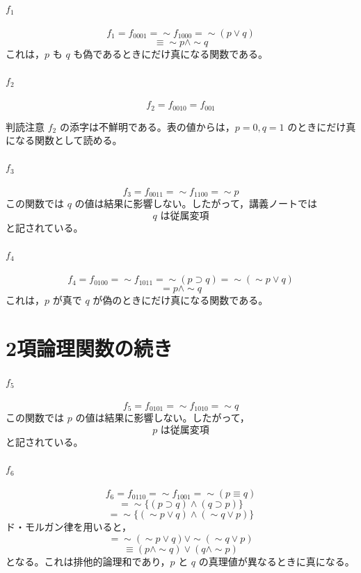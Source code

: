 \documentclass[../main.tex]{subfiles}
\begin{document}
\paragraph{\texorpdfstring{\(f_1\)}{f1}}
\[
  f_1
  =
  f_{0001}
  =
  \sim f_{1000}
  =
  \sim(p \lor q)
\]
\[
  \equiv
  \sim p \land \sim q
\]
これは，\(p\) も \(q\) も偽であるときにだけ真になる関数である。

\paragraph{\texorpdfstring{\(f_2\)}{f2}}
\[
  f_2
  =
  f_{0010}
  =
  f_{001}
\]

\begin{sidebox}[TBred]{判読注意}
  \(f_2\) の添字は不鮮明である。表の値からは，\(p=0,q=1\) のときにだけ真になる関数として読める。
\end{sidebox}

\paragraph{\texorpdfstring{\(f_3\)}{f3}}
\[
  f_3
  =
  f_{0011}
  =
  \sim f_{1100}
  =
  \sim p
\]
この関数では \(q\) の値は結果に影響しない。したがって，講義ノートでは
\[
  q \text{ は従属変項}
\]
と記されている。

\paragraph{\texorpdfstring{\(f_4\)}{f4}}
\[
  f_4
  =
  f_{0100}
  =
  \sim f_{1011}
  =
  \sim(p \supset q)
  =
  \sim(\sim p \lor q)
\]
\[
  =
  p \land \sim q
\]
これは，\(p\) が真で \(q\) が偽のときにだけ真になる関数である。

\section{2項論理関数の続き}

\paragraph{\texorpdfstring{\(f_5\)}{f5}}
\[
  f_5
  =
  f_{0101}
  =
  \sim f_{1010}
  =
  \sim q
\]
この関数では \(p\) の値は結果に影響しない。したがって，
\[
  p \text{ は従属変項}
\]
と記されている。

\paragraph{\texorpdfstring{\(f_6\)}{f6}}
\[
  f_6
  =
  f_{0110}
  =
  \sim f_{1001}
  =
  \sim(p \equiv q)
\]
\[
  =
  \sim\{(p \supset q) \land (q \supset p)\}
\]
\[
  =
  \sim\{(\sim p \lor q) \land (\sim q \lor p)\}
\]
ド・モルガン律を用いると，
\[
  =
  \sim(\sim p \lor q)
  \lor
  \sim(\sim q \lor p)
\]
\[
  \equiv
  (p \land \sim q)
  \lor
  (q \land \sim p)
\]
となる。これは排他的論理和であり，\(p\) と \(q\) の真理値が異なるときに真になる。
\end{document}

